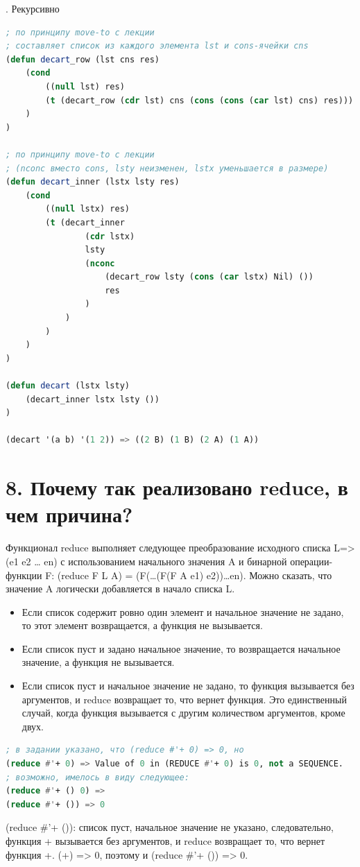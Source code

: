 \documentclass[12pt]{report}
\begin{document}
. Рекурсивно
\begin{lstlisting}[language=Lisp]
; по принципу move-to с лекции
; составляет список из каждого элемента lst и cons-ячейки cns
(defun decart_row (lst cns res) 
	(cond
		((null lst) res)
		(t (decart_row (cdr lst) cns (cons (cons (car lst) cns) res)))
	)
)

; по принципу move-to с лекции 
; (nconc вместо cons, lsty неизменен, lstx уменьшается в размере)
(defun decart_inner (lstx lsty res) 
	(cond
		((null lstx) res)
		(t (decart_inner 
				(cdr lstx) 
				lsty 
				(nconc 
					(decart_row lsty (cons (car lstx) Nil) ())
					res
				)
			)
		)
	)
)	

(defun decart (lstx lsty) 
	(decart_inner lstx lsty ())
)

(decart '(a b) '(1 2)) => ((2 B) (1 B) (2 A) (1 A))	
\end{lstlisting}


\section*{8. Почему так реализовано reduce, в чем причина?}

Функционал reduce выполняет следующее преобразование исходного списка L=>(e1 e2 … en) с использованием начального значения A и бинарной операции-функции F: (reduce F L A) = (F(…(F(F A e1) e2))…en). Можно сказать, что значение A логически добавляется в начало списка L.

\begin{itemize}
	\item Если список содержит ровно один элемент и начальное значение не задано, то этот элемент возвращается, а функция не вызывается. 
	\item Если список пуст и задано начальное значение, то возвращается начальное значение, а функция не вызывается. 
	\item Если список пуст и начальное значение не задано, то функция вызывается без аргументов, и reduce возвращает то, что вернет функция. Это единственный случай, когда функция вызывается с другим количеством аргументов, кроме двух.
\end{itemize}

\begin{lstlisting}[language=Lisp]
; в задании указано, что (reduce #'+ 0) => 0, но
(reduce #'+ 0) => Value of 0 in (REDUCE #'+ 0) is 0, not a SEQUENCE.
; возможно, имелось в виду следующее:
(reduce #'+ () 0) => 
(reduce #'+ ()) => 0
\end{lstlisting}

(reduce \#'+ ()): список пуст, начальное значение не указано, следовательно, функция + вызывается без аргументов, и reduce возвращает то, что вернет функция +. (+) => 0, поэтому и (reduce #'+ ()) => 0.


	

	
\end{document}
